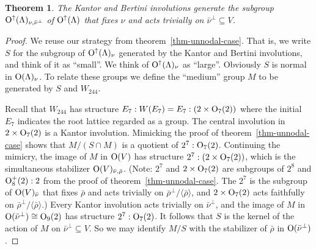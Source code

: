 \documentclass[12pt]{amsart}
\def\Orth{{\rm O}}
\def\Oup{\Orth^{\uparrow}}
\def\nubar{{\bar{\nu}}}
\def\rhobar{{\bar{\rho}}}
\def\iso{\cong}
\def\sset{\subseteq}
\def\generatedby#1{\langle#1\rangle}
\def\gend#1{\generatedby{#1}}
\newtheorem{theorem}{Theorem}
\numberwithin{theorem}{section}
\numberwithin{equation}{section}
\numberwithin{figure}{section}
\theoremstyle{remark}
\begin{document}
\begin{theorem}
\label{thm-Kantor-and-Bertini-inside-245}
  The Kantor and Bertini involutions generate the subgroup
$\Oup(\Lambda)_{\nu,\nubar^\perp}$
  of
$\Oup(\Lambda)$ that fixes $\nu$ and acts trivially on $\nubar^\perp\sset V$.
\end{theorem}

\begin{proof}
We reuse our strategy from theorem~\ref{thm-unnodal-case}.  That is, we write $S$ for
the subgroup of $\Oup(\Lambda)_\nu$ generated by the Kantor and
Bertini involutions, and think of it as ``small''.  We think of
$\Oup(\Lambda)_\nu$ as ``large''.  Obviously $S$ is normal in $\Orth(\Lambda)_\nu$.  To
relate these groups we define the ``medium'' group $M$ to be generated
by $S$ and $W_{244}$.

Recall that $W_{244}$ has structure
$E_7:W(E_7)=E_7:(2\times\Orth_7(2))$ where the initial $E_7$ indicates the root lattice regarded
as a group. The central involution in $2\times\Orth_7(2)$ is a Kantor
involution.  Mimicking the proof of theorem~\ref{thm-unnodal-case} shows that
$M/(S\cap M)$ is a quotient of $2^7:\Orth_7(2)$.  Continuing the mimicry,
the image of $M$ in $\Orth(V)$ has structure $2^7:(2\times\Orth_7(2))$,
which is the simultaneous stabilizer $\Orth(V)_{\nubar,\rhobar}$.  (Note:
$2^7$ and $2\times\Orth_7(2)$ are subgroups of $2^8$ and
$\Orth_8^+(2):2$ from the proof of theorem~\ref{thm-unnodal-case}.
The $2^7$ is
the subgroup of $\Orth(V)_\nubar$ that fixes $\rhobar$ and acts trivially
on $\rhobar^\perp/\gend{\rhobar}$,  and $2\times\Orth_7(2)$ acts faithfully on
$\rhobar^\perp/\gend{\rhobar}$.)  Every Kantor involution acts trivially
on $\nubar^\perp$, and the image of $M$ in $\Orth(\nubar^\perp)\iso\Orth_9(2)$ has
structure $2^7:\Orth_7(2)$.  It follows that $S$ is the kernel of the
action of $M$ on $\nubar^\perp\sset V$.  So we may identify $M/S$ with
the stabilizer of $\rhobar$ in $\Orth(\nubar^\perp)$.


\end{proof}
\end{document}
